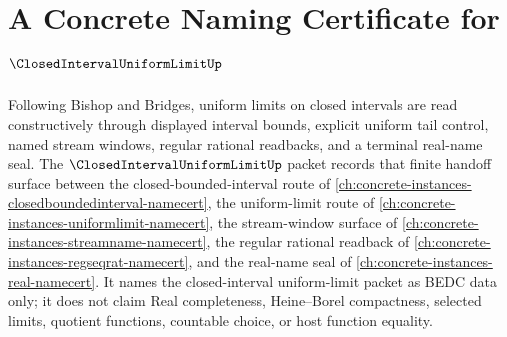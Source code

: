 \chapter{A Concrete Naming Certificate for $\ClosedIntervalUniformLimitUp$}
\label{ch:concrete-instances-closed-interval-uniform-limit-namecert}

Following Bishop and Bridges, uniform limits on closed intervals are read constructively through displayed interval bounds, explicit uniform tail control, named stream windows, regular rational readbacks, and a terminal real-name seal. The $\ClosedIntervalUniformLimitUp$ packet records that finite handoff surface between the closed-bounded-interval route of \autoref{ch:concrete-instances-closedboundedinterval-namecert}, the uniform-limit route of \autoref{ch:concrete-instances-uniformlimit-namecert}, the stream-window surface of \autoref{ch:concrete-instances-streamname-namecert}, the regular rational readback of \autoref{ch:concrete-instances-regseqrat-namecert}, and the real-name seal of \autoref{ch:concrete-instances-real-namecert}. It names the closed-interval uniform-limit packet as BEDC data only; it does not claim Real completeness, Heine--Borel compactness, selected limits, quotient functions, countable choice, or host function equality.


